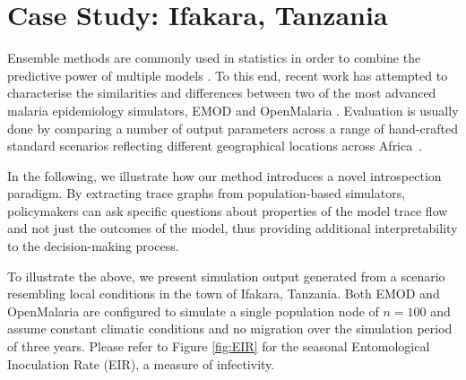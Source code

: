 \documentclass{article}
\newcommand{\bg}[1]{~{{[{\it \textcolor{red}{{\bf BG:} #1}}]}}}
\begin{document}

\section{Case Study: Ifakara, Tanzania}
\label{sec:casestudy}

Ensemble methods are commonly used in statistics in order to combine the predictive power of multiple models \cite{cameron2015defining,smith_ensemble_2012}. To this end, recent work has attempted to characterise the similarities and differences between two of the most advanced malaria epidemiology simulators, EMOD \cite{bershteyn2018implementation} and OpenMalaria \cite{smith2008towards}. Evaluation is usually done by comparing a number of output parameters across a range of hand-crafted standard scenarios reflecting different geographical locations across Africa~\cite{smith_ensemble_2012}.

In the following, we illustrate how our method introduces a novel introspection paradigm. By extracting trace graphs from population-based simulators, policymakers can ask specific questions about properties of the model trace flow
and not just the outcomes of the model, thus providing additional interpretability to the decision-making process. 

To illustrate the above, we present simulation output generated from a scenario resembling local conditions in the town of Ifakara, Tanzania. Both EMOD and OpenMalaria are configured to simulate a single population node of $n=100$ and assume constant climatic conditions and no migration over the simulation period of three years. Please refer to Figure \ref{fig:EIR} for the seasonal Entomological Inoculation Rate (EIR), a measure of infectivity.
\end{document}
